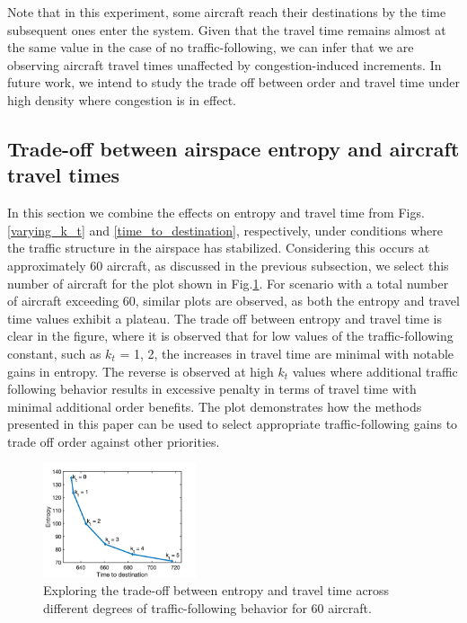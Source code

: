 \documentclass[conference, letter]{IEEEtran}
\begin{document}
Note that in this experiment, some aircraft reach their destinations by the time subsequent ones enter the system. Given that the travel time remains almost at the same value in the case of no traffic-following, we can infer that we are observing aircraft travel times unaffected by congestion-induced increments. In future work, we intend to study the trade off between order and travel time under high density where congestion is in effect. 

\subsection{Trade-off between airspace entropy and aircraft travel times}


In this section we combine the effects on entropy and travel time from Figs. \ref{varying_k_t} and \ref{time_to_destination}, respectively, under conditions where the traffic structure in the airspace has stabilized. Considering this occurs at approximately 60 aircraft, as discussed in the previous subsection, we select this number of aircraft for the plot shown in Fig.\ref{time_vs_entropy}. For scenario with a total number of aircraft exceeding 60, similar plots are observed, as both the entropy and travel time values exhibit a plateau. The trade off between entropy and travel time is clear in the figure, where it is observed that for low values of the traffic-following constant, such as $k_t$ = 1, 2, the increases in travel time are minimal with notable gains in entropy. The reverse is observed at high $k_t$ values where additional traffic following behavior results in excessive penalty in terms of travel time with minimal additional order benefits. The plot demonstrates how the methods presented in this paper can be used to select appropriate traffic-following gains to trade off order against other priorities. 

\begin{figure}[hbt!]
\centering
\includegraphics[width=0.4\textwidth]{time_vs_entropy.png}
\caption{Exploring the trade-off between entropy and travel time across different degrees of traffic-following behavior for 60 aircraft.}
\label{time_vs_entropy}
\end{figure}
\end{document}
